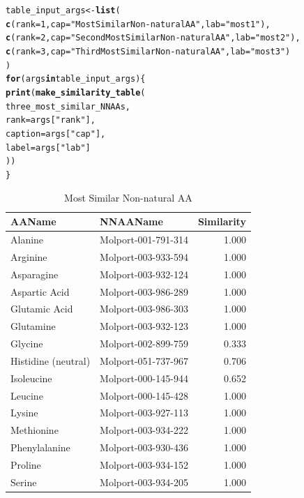 \documentclass[a4paper,11pt]{article}\usepackage[]{graphicx}\usepackage[]{xcolor}
\makeatletter
\newcommand{\hlnum}[1]{\textcolor[rgb]{0.686,0.059,0.569}{#1}}%
\newcommand{\hlsng}[1]{\textcolor[rgb]{0.192,0.494,0.8}{#1}}%
\newcommand{\hldef}[1]{\textcolor[rgb]{0.345,0.345,0.345}{#1}}%
\newcommand{\hlkwa}[1]{\textcolor[rgb]{0.161,0.373,0.58}{\textbf{#1}}}%
\newcommand{\hlkwb}[1]{\textcolor[rgb]{0.69,0.353,0.396}{#1}}%
\newcommand{\hlkwc}[1]{\textcolor[rgb]{0.333,0.667,0.333}{#1}}%
\newcommand{\hlkwd}[1]{\textcolor[rgb]{0.737,0.353,0.396}{\textbf{#1}}}%
\newenvironment{kframe}{%
 \def\at@end@of@kframe{}%
 \ifinner\ifhmode%
  \def\at@end@of@kframe{\end{minipage}}%
  \begin{minipage}{\columnwidth}%
 \fi\fi%
 \def\FrameCommand##1{\hskip\@totalleftmargin \hskip-\fboxsep
 \colorbox{shadecolor}{##1}\hskip-\fboxsep
     \hskip-\linewidth \hskip-\@totalleftmargin \hskip\columnwidth}%
 \MakeFramed {\advance\hsize-\width
   \@totalleftmargin\z@ \linewidth\hsize
   \@setminipage}}%
 {\par\unskip\endMakeFramed%
 \at@end@of@kframe}
\makeatother
\begin{document}
\begin{enumerate}
\begin{kframe}
\begin{alltt}
\hldef{table_input_args} \hlkwb{<-} \hlkwd{list}\hldef{(}
  \hlkwd{c}\hldef{(}\hlkwc{rank} \hldef{=} \hlnum{1}\hldef{,} \hlkwc{cap} \hldef{=} \hlsng{"Most Similar Non-natural AA"}\hldef{,} \hlkwc{lab} \hldef{=} \hlsng{"most1"}\hldef{),}
  \hlkwd{c}\hldef{(}\hlkwc{rank} \hldef{=} \hlnum{2}\hldef{,} \hlkwc{cap} \hldef{=} \hlsng{"Second Most Similar Non-natural AA"}\hldef{,} \hlkwc{lab} \hldef{=} \hlsng{"most2"}\hldef{),}
  \hlkwd{c}\hldef{(}\hlkwc{rank} \hldef{=} \hlnum{3}\hldef{,} \hlkwc{cap} \hldef{=} \hlsng{"Third Most Similar Non-natural AA"}\hldef{,} \hlkwc{lab} \hldef{=} \hlsng{"most3"}\hldef{)}
\hldef{)}
\hlkwa{for} \hldef{(args} \hlkwa{in} \hldef{table_input_args) \{}
  \hlkwd{print}\hldef{(}\hlkwd{make_similarity_table}\hldef{(}
    \hldef{three_most_similar_NNAAs,}
    \hlkwc{rank} \hldef{= args[}\hlsng{"rank"}\hldef{],}
    \hlkwc{caption} \hldef{= args[}\hlsng{"cap"}\hldef{],}
    \hlkwc{label} \hldef{= args[}\hlsng{"lab"}\hldef{]}
  \hldef{))}
\hldef{\}}
\end{alltt}
\end{kframe}\begin{table}[H] \captionsetup{margin = 55pt}
\centering
\caption{\label{tab:most1}Most Similar Non-natural AA}
\centering
\fontsize{10}{12}\selectfont
\begin{tabular}[t]{llr}
\toprule
AAName & NNAAName & Similarity\\
\midrule
Alanine & Molport-001-791-314 & 1.000\\
Arginine & Molport-003-933-594 & 1.000\\
Asparagine & Molport-003-932-124 & 1.000\\
Aspartic Acid & Molport-003-986-289 & 1.000\\
Glutamic Acid & Molport-003-986-303 & 1.000\\
Glutamine & Molport-003-932-123 & 1.000\\
Glycine & Molport-002-899-759 & 0.333\\
Histidine (neutral) & Molport-051-737-967 & 0.706\\
Isoleucine & Molport-000-145-944 & 0.652\\
Leucine & Molport-000-145-428 & 1.000\\
Lysine & Molport-003-927-113 & 1.000\\
Methionine & Molport-003-934-222 & 1.000\\
Phenylalanine & Molport-003-930-436 & 1.000\\
Proline & Molport-003-934-152 & 1.000\\
Serine & Molport-003-934-205 & 1.000\\

\end{tabular}
\end{table}
\end{enumerate}
\end{document}
